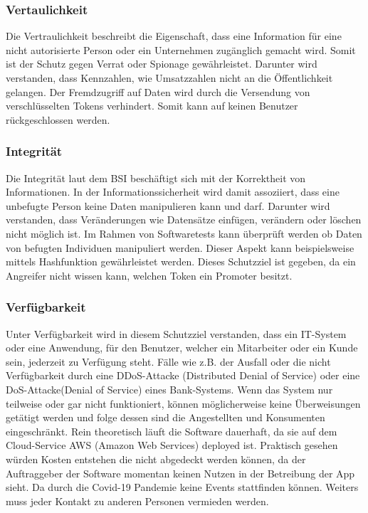 \subsubsection{Vertaulichkeit}
Die Vertraulichkeit beschreibt die Eigenschaft, dass eine Information für eine nicht autorisierte Person oder ein Unternehmen zugänglich gemacht wird. Somit ist der Schutz gegen Verrat oder Spionage gewährleistet. Darunter wird verstanden, dass Kennzahlen, wie Umsatzzahlen nicht an die Öffentlichkeit gelangen. 
Der Fremdzugriff auf Daten wird durch die Versendung von verschlüsselten Tokens verhindert. Somit kann auf keinen Benutzer rückgeschlossen werden.

\subsubsection{Integrität}
Die Integrität laut dem BSI beschäftigt sich mit der Korrektheit von Informationen. In der Informationssicherheit wird damit assoziiert, dass eine unbefugte Person keine Daten manipulieren kann und darf. Darunter wird verstanden, dass Veränderungen wie Datensätze einfügen, verändern oder löschen nicht möglich ist.
Im Rahmen von Softwaretests kann überprüft werden ob Daten von befugten Individuen manipuliert werden. Dieser Aspekt kann beispielsweise mittels Hashfunktion gewährleistet werden.
Dieses Schutzziel ist gegeben, da ein Angreifer nicht wissen kann, welchen Token ein Promoter besitzt.

\subsubsection{Verfügbarkeit}
Unter Verfügbarkeit wird in diesem Schutzziel verstanden, dass ein IT-System oder eine Anwendung, für den Benutzer, welcher ein Mitarbeiter oder ein Kunde sein, jederzeit zu Verfügung steht. Fälle wie z.B. der Ausfall oder die nicht Verfügbarkeit durch eine DDoS-Attacke (Distributed Denial of Service) oder eine DoS-Attacke(Denial of Service) eines Bank-Systems. Wenn das System nur teilweise oder gar nicht funktioniert, können möglicherweise keine Überweisungen getätigt werden und folge dessen sind die Angestellten und Konsumenten eingeschränkt. 
Rein theoretisch läuft die Software dauerhaft, da sie auf dem Cloud-Service AWS (Amazon Web Services) deployed ist. Praktisch gesehen würden Kosten entstehen die nicht abgedeckt werden können, da der Auftraggeber der Software momentan keinen Nutzen in der Betreibung der App sieht. Da durch die Covid-19 Pandemie keine Events stattfinden können. Weiters muss jeder Kontakt zu anderen Personen vermieden werden. 

